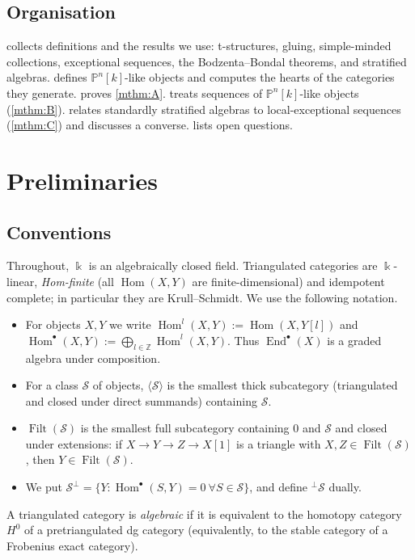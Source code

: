 \documentclass[11pt,reqno]{amsart}
\theoremstyle{plain}
\theoremstyle{definition}
\theoremstyle{remark}
\newcommand{\kk}{\Bbbk}
\DeclareMathOperator{\Hom}{Hom}
\DeclareMathOperator{\End}{End}
\DeclareMathOperator{\Filt}{Filt}
\newcommand{\thick}[1]{\langle #1\rangle}
\newcommand{\Pn}[2]{\mathbb{P}^{#1}[#2]}
\begin{document}
\subsection*{Organisation}
 collects definitions and the results we use: t-structures, gluing, simple-minded collections, exceptional sequences, the Bodzenta--Bondal theorems, and stratified algebras.  defines $\Pn nk$-like objects and computes the hearts of the categories they generate.  proves \cref{mthm:A}.  treats sequences of $\Pn nk$-like objects (\cref{mthm:B}).  relates standardly stratified algebras to local-exceptional sequences (\cref{mthm:C}) and discusses a converse.  lists open questions.

\section{Preliminaries}\label{sec:prelim}

\subsection{Conventions}
Throughout, $\kk$ is an algebraically closed field. Triangulated categories are $\kk$-linear, \emph{Hom-finite} (all $\Hom(X,Y)$ are finite-dimensional) and idempotent complete; in particular they are Krull--Schmidt. We use the following notation.
\begin{itemize}
\item For objects $X,Y$ we write $\Hom^l(X,Y):=\Hom(X,Y[l])$ and $\Hom^\bullet(X,Y):=\bigoplus_{l\in\mathbb{Z}}\Hom^l(X,Y)$. Thus $\End^\bullet(X)$ is a graded algebra under composition.
\item For a class $\mathcal S$ of objects, $\thick{\mathcal S}$ is the smallest thick subcategory (triangulated and closed under direct summands) containing $\mathcal S$.
\item $\Filt(\mathcal S)$ is the smallest full subcategory containing $0$ and $\mathcal S$ and closed under extensions: if $X\to Y\to Z\to X[1]$ is a triangle with $X,Z\in\Filt(\mathcal S)$, then $Y\in\Filt(\mathcal S)$.
\item We put $\mathcal S^\perp=\{Y:\Hom^\bullet(S,Y)=0\ \forall S\in\mathcal S\}$, and define ${}^\perp\mathcal S$ dually.
\end{itemize}
A triangulated category is \emph{algebraic} if it is equivalent to the homotopy category $H^0$ of a pretriangulated dg category (equivalently, to the stable category of a Frobenius exact category).
\end{document}
